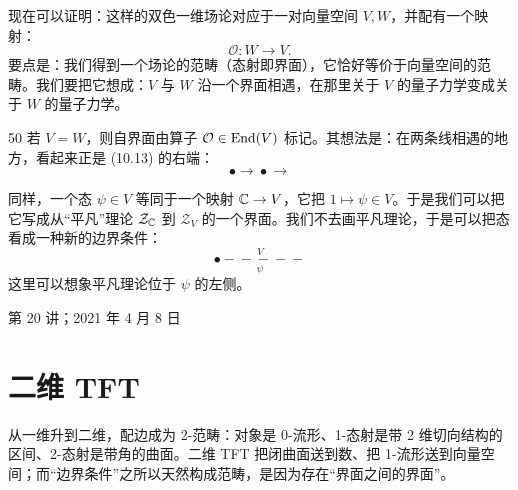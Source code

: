 现在可以证明：这样的双色一维场论对应于一对向量空间 $V,W$，并配有一个映射：
\begin{equation}\tag{10.19}
\mathcal{O}\colon W\longrightarrow V.
\end{equation}
要点是：我们得到一个场论的范畴（态射即界面），它恰好等价于向量空间的范畴。我们要把它想成：$V$ 与 $W$ 沿一个界面相遇，在那里关于 $V$ 的量子力学变成关于 $W$ 的量子力学。

\begin{srcex}{50}
若 $V=W$，则自界面由算子 $\mathcal{O}\in\mathrm{End}(V)$ 标记。其想法是：在两条线相遇的地方，看起来正是 (10.13) 的右端：
\begin{equation}\tag{10.20}
\bullet\!\!\longrightarrow\!\!\bullet\!\!\longrightarrow
\end{equation}
\end{srcex}

同样，一个态 $\psi\in V$ 等同于一个映射 $\mathbb{C}\to V$，它把 $1\mapsto\psi\in V$。于是我们可以把它写成从“平凡”理论 $\mathcal{Z}_{\mathbb{C}}$ 到 $\mathcal{Z}_V$ 的一个界面。我们不去画平凡理论，于是可以把态看成一种新的边界条件：
\begin{equation}\tag{10.21}
\overset{\textstyle V}{\underset{\textstyle \psi}{\bullet\!\!-\!\!-\!\!-\!\!-\!\!-}}
\end{equation}
这里可以想象平凡理论位于 $\psi$ 的左侧。


\begin{flushright}\small 第 20 讲；2021 年 4 月 8 日\end{flushright}

\section{二维 TFT}\label{sec:10-4}

\begin{sectionkey}
从一维升到二维，配边成为 2-范畴：对象是 0-流形、1-态射是带 2 维切向结构的区间、2-态射是带角的曲面。二维 TFT 把闭曲面送到数、把 1-流形送到向量空间；而“边界条件”之所以天然构成范畴，是因为存在“界面之间的界面”。
\end{sectionkey}

